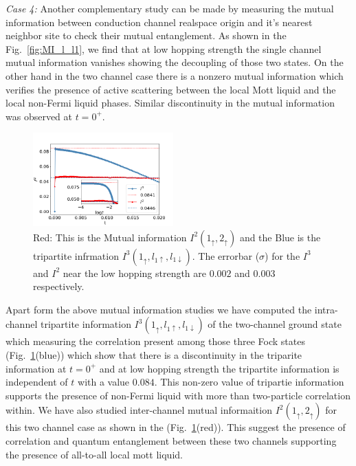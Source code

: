 \documentclass[reprint,prb,superscriptaddress]{revtex4-2}
\begin{document}
\par \textit{Case 4:} Another complementary study can be made by measuring the mutual information between conduction channel realspace origin and it's nearest neighbor site to check their mutual entanglement. As shown in the Fig.~\ref{fig:MI_l_l1}, we find that at low hopping strength the single channel mutual information vanishes showing the decoupling of those two states. On the other hand in the two channel case there is a nonzero mutual information which verifies the presence of active scattering between the local Mott liquid and the local non-Fermi liquid phases. Similar discontinuity in the mutual information was observed at $t=0^+$.
\begin{figure}[!htpb]
\centering
\includegraphics[width=0.48\textwidth]{plt/I3_I2_A_I.png}
\caption{Red: This is the Mutual information $I^2(1_{\uparrow},2_{\uparrow})$ and the Blue is the tripartite infrmation $I^3(1_{\uparrow},l_{1\uparrow},l_{1\downarrow})$. The errorbar ($\sigma$) for the $I^3$ and $I^2$ near the low hopping strength are $0.002$ and $0.003$ respectively.}
\label{fig:I3_I2_two_channel}
\end{figure}
Apart form the above mutual information studies we have computed the intra-channel tripartite information $I^3(1_{\uparrow},l_{1\uparrow},l_{1\downarrow})$ of the two-channel ground state which measuring the correlation present among those three Fock states (Fig.~\ref{fig:I3_I2_two_channel}(blue)) which show that there is a discontinuity in the triparite information at $t=0^+$ and at low hopping strength the tripartite information is independent of $t$ with a value $0.084$. This non-zero value of tripartie information supports the presence of non-Fermi liquid with more than two-particle correlation within. We have also studied inter-channel mutual informaition $I^2(1_{\uparrow},2_{\uparrow})$ for this two channel case as shown in the (Fig.~\ref{fig:I3_I2_two_channel}(red)). This suggest the presence of correlation and quantum entanglement between these two channels supporting the presence of all-to-all local mott liquid.
\end{document}
